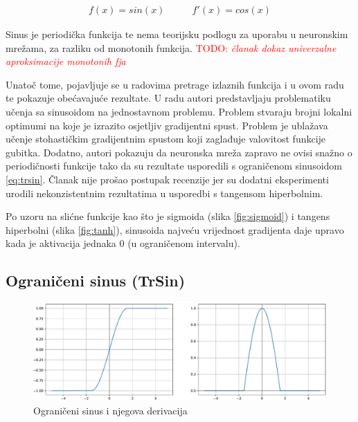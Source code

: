 \documentclass[times, utf8, numeric, diplomski]{fer}
\def\figref#1{(slika \ref{#1})}
\def\TODO#1{\noindent\textcolor{red}{TODO: \textit{#1}}\newline}
\def\todo#1{\TODO{#1}}
\begin{document}
\begin{equation}
\label{eq:sin}
\begin{split}
f(x) = sin(x)
\end{split}
\qquad
\begin{split}
f'(x) = cos(x)
\end{split}
\end{equation}

Sinus je periodička funkcija te nema teorijsku podlogu za uporabu u neuronskim mrežama, za razliku od monotonih funkcija.
\todo{članak dokaz univerzalne aproksimacije monotonih fja}

Unatoč tome, pojavljuje se u radovima pretrage izlaznih funkcija \citep{elish} i u ovom radu te pokazuje obećavajuće rezultate. U radu \citet{taming_waves} autori predstavljaju problematiku učenja sa sinusoidom na jednostavnom problemu. Problem stvaraju brojni lokalni optimumi na koje je izrazito osjetljiv gradijentni spust. Problem je ublažava učenje stohastičkim gradijentnim spustom koji zaglađuje valovitost funkcije gubitka. Dodatno, autori pokazuju da neuronska mreža zapravo ne ovisi snažno o periodičnosti funkcije tako da su rezultate usporedili s ograničenom sinusoidom \eqref{eq:trsin}. Članak nije prošao postupak recenzije jer su dodatni eksperimenti urodili nekonzistentnim rezultatima u usporedbi s tangensom hiperbolnim.

Po uzoru na slićne funkcije kao što je sigmoida \figref{fig:sigmoid} i tangens hiperbolni \figref{fig:tanh}, sinusoida najveću vrijednost gradijenta daje upravo kada je aktivacija jednaka 0 (u ograničenom intervalu).

\subsection{Ograničeni sinus (TrSin)}
\label{func:trsin}

\begin{figure}[H]
\includegraphics[width=\textwidth]{TrSin.pdf}
\centering
\caption{Ograničeni sinus i njegova derivacija}
\label{fig:trsin}
\end{figure}
\end{document}
